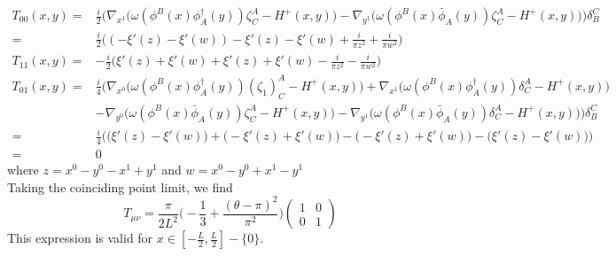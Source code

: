 \begin{equation}
\begin{split}
T_{00}(x,y) = 
& \frac{i}{2}\Big(\nabla_{x^1} \big( \omega(\phi^B(x) \phi^\dagger_A(y))\zeta^A_C - H^+(x,y) \big)
- \nabla_{y^1} \big( \omega( \phi^B(x) \bar{\phi}_A(y))\zeta^A_C - H^+(x,y) \big)
\Big)\delta_B^C  \\
= & \frac{i}{2} \big( (-\xi'(z) - \xi'(w)) - \xi'(z) - \xi'(w) + \frac{i}{\pi z^2} + \frac{i}{\pi w^2} \big)   \\
T_{11}(x,y) =
& - \frac{i}{2}\big( \xi'(z) + \xi'(w) + \xi'(z) + \xi'(w) - \frac{i}{\pi z^2} - \frac{i}{\pi w^2}\big) \\
T_{01}(x,y) = 
& \frac{i}{4}\Big(\nabla_{x^0} \big( \omega(\phi^B(x) \phi^\dagger_A(y))(\zeta_1)^A_C - H^+(x,y) \big) + \nabla_{x^1} \big( \omega(\phi^B(x) \phi^\dagger_A(y))\delta^A_C - H^+(x,y) \big)  \\
& - \nabla_{y^0} \big( \omega( \phi^B(x) \bar{\phi}_A(y))\zeta^A_C - H^+(x,y) \big)
- \nabla_{y^1} \big( \omega( \phi^B(x) \bar{\phi}_A(y))\delta^A_C - H^+(x,y) \big)
\Big)\delta_B^C \\
= & \frac{i}{4}\Big( \big( \xi'(z) - \xi'(w) \big) + \big(- \xi'(z) + \xi'(w) \big) - \big( - \xi'(z) + \xi'(w) \big) - \big( \xi'(z) - \xi'(w) \big) \Big) \\
= & 0
\end{split}
\end{equation}
where $z = x^0 - y^0 - x^1 + y^1$ and $w = x^0 - y^0 + x^1 - y^1$ \\
Taking the coinciding point limit, we find
\begin{equation}
T_{\mu\nu} = \frac{ \pi}{2 L^2} \big( -\frac{1}{3} + \frac{(\theta - \pi)^2}{\pi^2}\big)\begin{pmatrix}
1  & 0 \\ 0  &  1
\end{pmatrix}
\end{equation}
This expression is valid for $x\in[-\frac L 2 , \frac L 2] - \{0\}$.
